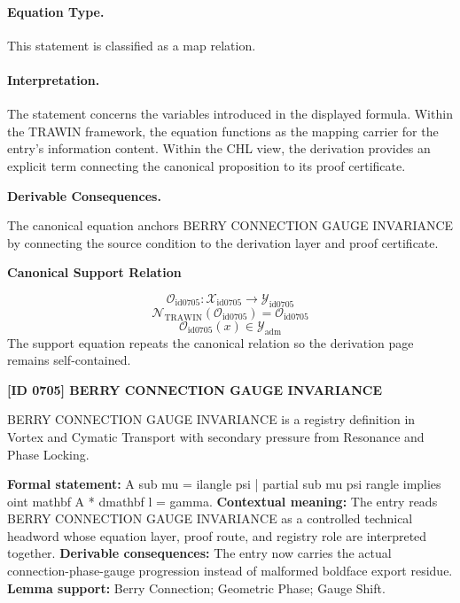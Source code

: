\paragraph{Equation Type.}
This statement is classified as a map relation.

\paragraph{Interpretation.}
The statement concerns the variables introduced in the displayed formula. Within the TRAWIN framework, the equation functions as the mapping carrier for the entry’s information content. Within the CHL view, the derivation provides an explicit term connecting the canonical proposition to its proof certificate.

\par\vspace{0.35em}
\noindent\textbf{Derivable Consequences.}\quad
\begingroup
\footnotesize
\raggedright
The canonical equation anchors BERRY CONNECTION GAUGE INVARIANCE by connecting the source condition to the derivation layer and proof certificate.
\par\endgroup

\noindent\textbf{Canonical Support Relation}\par
\[
\mathcal{O}_{\mathrm{id0705}}:\mathcal{X}_{\mathrm{id0705}}\longrightarrow\mathcal{Y}_{\mathrm{id0705}}
\]
\[
\mathcal{N}_{\mathrm{TRAWIN}}(\mathcal{O}_{\mathrm{id0705}})=\mathcal{O}_{\mathrm{id0705}}
\]
\[
\mathcal{O}_{\mathrm{id0705}}(x)\in\mathcal{Y}_{\mathrm{adm}}
\]
\noindent The support equation repeats the canonical relation so the derivation page remains self-contained.\par

\clearpage
\noindent\textbf{[ID 0705] BERRY CONNECTION GAUGE INVARIANCE}\par
\vspace{0.35em}
\begingroup\small
{}
BERRY CONNECTION GAUGE INVARIANCE is a registry definition in Vortex and Cymatic Transport with secondary pressure from Resonance and Phase Locking.

\begingroup\footnotesize\setlength{\emergencystretch}{3em}\sloppy
\textbf{Formal statement:} A sub mu = ilangle psi | partial sub mu psi rangle implies oint mathbf A * dmathbf l = gamma. \textbf{Contextual meaning:} The entry reads BERRY CONNECTION GAUGE INVARIANCE as a controlled technical headword whose equation layer, proof route, and registry role are interpreted together. \textbf{Derivable consequences:} The entry now carries the actual connection-phase-gauge progression instead of malformed boldface export residue. \textbf{Lemma support:} Berry Connection; Geometric Phase; Gauge Shift.\par
\endgroup


